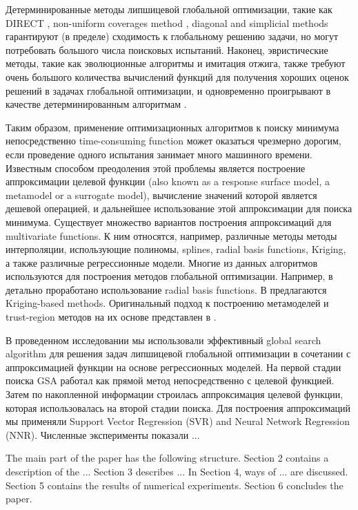 \documentclass[sensors,article,submit,moreauthors,pdftex]{Definitions/mdpi}
\begin{document}
Детерминированные методы липшицевой глобальной оптимизации, такие как DIRECT \cite{Jones1993,Gablonsky2001,Jones2009}, non-uniform coverages method \cite{Evtushenko2009,Evtushenko2013}, diagonal \cite{Sergeyev2017} and simplicial \cite{Zilinskas2014} methods гарантируют (в пределе) сходимость к глобальному решению задачи, но могут потребовать большого числа поисковых испытаний.
Наконец, эвристические методы, такие как эволюционные алгоритмы и имитация отжига, также требуют очень большого количества вычислений функций для получения хороших оценок решений в задачах глобальной оптимизации, и одновременно проигрывают в качестве  детерминированным алгоритмам \cite{Sergeyev2018,Kvasov2018}.

Таким образом, применение оптимизационных алгоритмов к поиску минимума непосредственно time-consuming function может оказаться чрезмерно дорогим, если проведение одного испытания занимает много машинного времени.
 Известным способом преодоления этой проблемы является построение аппроксимации целевой функции (also known as a response surface model, a metamodel or a surrogate model), вычисление значений которой является дешевой операцией, и дальнейшее использование этой аппроксимации для поиска минимума. 
Существует множество вариантов построения аппроксимаций для multivariate functions. К ним относятся, например, различные методы методы интерполяции, использующие полиномы, splines, radial basis functions, Kriging, а также различные регрессионные модели. Многие из данных алгоритмов используются для построения методов глобальной оптимизации. 
Например, в \cite{Gutmann2001,Regis2005} детально проработано использование radial basis functions. В \cite{Jones1998,UrRehman2014,Ollar2017_1} предлагаются Kriging-based methods. Оригинальный подход к построению метамоделей и trust-region методов на их основе представлен в \cite{Polynkin2012,Ollar2017_2,Toropov2018}. 

В проведенном исследовании мы использовали эффективный global search algorithm \cite{Strongin2000,Sergeyev2013} для решения задач липшицевой глобальной оптимизации в сочетании с аппроксимацией функции на основе регрессионных моделей. На первой стадии поиска GSA работал как прямой метод непосредственно с целевой функцией. Затем по накопленной информации строилась аппроксимация целевой функции, которая использовалась на второй стадии поиска.
Для построения аппроксимаций мы применяли Support Vector Regression (SVR) and Neural Network Regression (NNR). 
Численные эксперименты показали ...

The main part of the paper has the following structure. 
Section 2 contains a description of the ... 
Section 3 describes ... 
In Section 4, ways of ... are discussed. 
Section 5 contains the results of numerical experiments. 
Section 6 concludes the paper.
\end{document}
